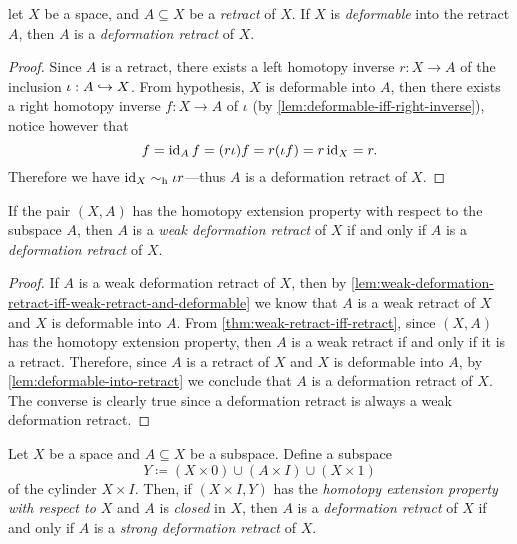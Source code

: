 \begin{lemma}
\label{lem:deformable-into-retract}
let \(X\) be a space, and \(A \subseteq X\) be a \emph{retract} of \(X\). If
\(X\) is \emph{deformable} into the retract \(A\), then \(A\) is a
\emph{deformation retract} of \(X\).
\end{lemma}

\begin{proof}
Since \(A\) is a retract, there exists a left homotopy inverse \(r: X \to A\)
of the inclusion \(\iota: A \hookrightarrow X\). From hypothesis, \(X\) is deformable into
\(A\), then there exists a right homotopy inverse \(f: X \to A\) of \(\iota\)
(by \cref{lem:deformable-iff-right-inverse}), notice however that
\[
f = \operatorname{id}_A f = (r \iota) f = r (\iota f) = r \operatorname{id}_X = r.
\]
Therefore we have \(\operatorname{id}_X \sim_{\text{h}} \iota r\)---thus \(A\) is a deformation retract
of \(X\).
\end{proof}

\begin{corollary}
\label{cor:htpy-extension-prop-weak-iff-deformation}
If the pair \((X, A)\) has the homotopy extension property with respect to the
subspace \(A\), then \(A\) is a \emph{weak deformation retract} of \(X\) if and
only if \(A\) is a \emph{deformation retract} of \(X\).
\end{corollary}

\begin{proof}
If \(A\) is a weak deformation retract of \(X\), then by
\cref{lem:weak-deformation-retract-iff-weak-retract-and-deformable} we know that
\(A\) is a weak retract of \(X\) and \(X\) is deformable into \(A\). From
\cref{thm:weak-retract-iff-retract}, since \((X, A)\) has the homotopy extension
property, then \(A\) is a weak retract if and only if it is a
retract. Therefore, since \(A\) is a retract of \(X\) and \(X\) is deformable
into \(A\), by \cref{lem:deformable-into-retract} we conclude that \(A\) is a
deformation retract of \(X\). The converse is clearly true since a deformation
retract is always a weak deformation retract.
\end{proof}

\begin{theorem}
\label{thm:deformation-retract-iff-strong-deformation-retract}
Let \(X\) be a space and \(A \subseteq X\) be a subspace. Define a subspace
\[
Y \coloneq (X \times 0) \cup (A \times I) \cup (X \times 1)
\]
of the cylinder \(X \times I\). Then, if \((X \times I, Y)\) has the
\emph{homotopy extension property with respect to \(X\)} and \(A\) is
\emph{closed} in \(X\), then \(A\) is a \emph{deformation retract} of \(X\) if
and only if \(A\) is a \emph{strong deformation retract} of \(X\).
\end{theorem}

